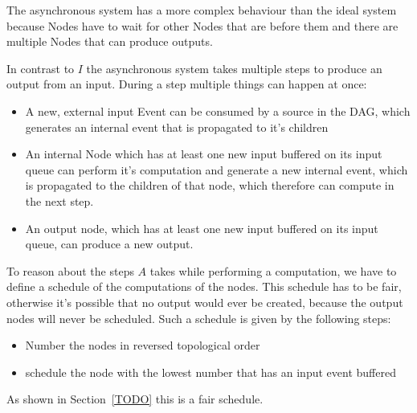 The asynchronous system has a more complex behaviour than the ideal system because Nodes have to wait for other Nodes that are before them
and there are multiple Nodes that can produce outputs.


In contrast to \(I\) the asynchronous system takes multiple steps to produce an output from an input.
During a step multiple things can happen at once:

\begin{itemize}
  \item A new, external input Event can be consumed by a source in the DAG, which generates an internal event that is propagated to it's children
  \item An internal Node which has at least one new input buffered on its input queue can perform
    it's computation and generate a new internal event, which is propagated to the children of that node, which therefore can compute in the next step.
  \item An output node, which has at least one new input buffered on its input queue, can produce a new output.
\end{itemize}

To reason about the steps $A$ takes while performing a computation, we have to define a schedule of the computations of the nodes.
This schedule has to be fair, otherwise it's possible that no output would ever be created, because the output nodes will never be scheduled.
Such a schedule is given by the following steps:

\begin{itemize}
  \item Number the nodes in reversed topological order
  \item schedule the node with the lowest number that has an input event buffered
\end{itemize}

As shown in Section~\ref{TODO} this is a fair schedule.

